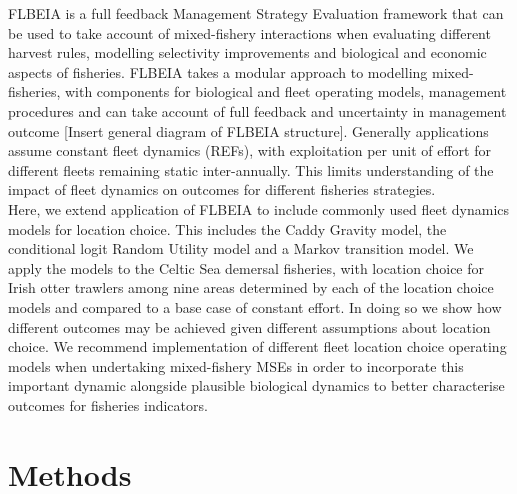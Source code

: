\documentclass[12pt, halfline, a4paper]{ouparticle}
\begin{document}
FLBEIA is a full feedback Management Strategy Evaluation framework that can be
used to take account of mixed-fishery interactions when evaluating different
harvest rules, modelling selectivity improvements and biological and economic
aspects of fisheries. FLBEIA takes a modular approach to modelling
mixed-fisheries, with components for biological and fleet operating models,
management procedures and can take account of full feedback and uncertainty in
management outcome [Insert general diagram of FLBEIA structure]. Generally
applications assume constant fleet dynamics (REFs), with exploitation per unit
of effort for different fleets remaining static inter-annually. This limits
understanding of the impact of fleet dynamics on outcomes for different
fisheries strategies. \\

Here, we extend application of FLBEIA to include commonly used fleet dynamics
models for location choice. This includes the Caddy Gravity model, the
conditional logit Random Utility model and a Markov transition model. We apply
the models to the Celtic Sea demersal fisheries, with location choice for Irish
otter trawlers among nine areas determined by each of the location choice
models and compared to a base case of constant effort. In doing so we show how
different outcomes may be achieved given different assumptions about location
choice. We recommend implementation of different fleet location choice
operating models when undertaking mixed-fishery MSEs in order to incorporate
this important dynamic alongside plausible biological dynamics to better
characterise outcomes for fisheries indicators. \\


\section{Methods}
\label{meth}
\end{document}
